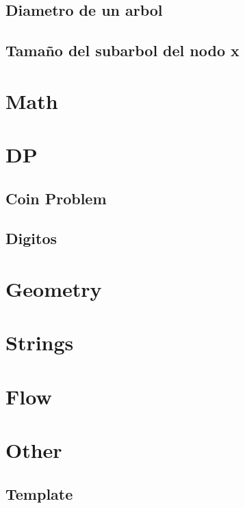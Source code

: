 	\subsection{Diametro de un arbol}
	\subsection{Tamaño del subarbol del nodo x}


\section{Math}

\section{DP}
	\subsection{Coin Problem}
	\subsection{Digitos}

\section{Geometry}


\section{Strings}


\section{Flow}


\section{Other}
	\subsection{Template}




